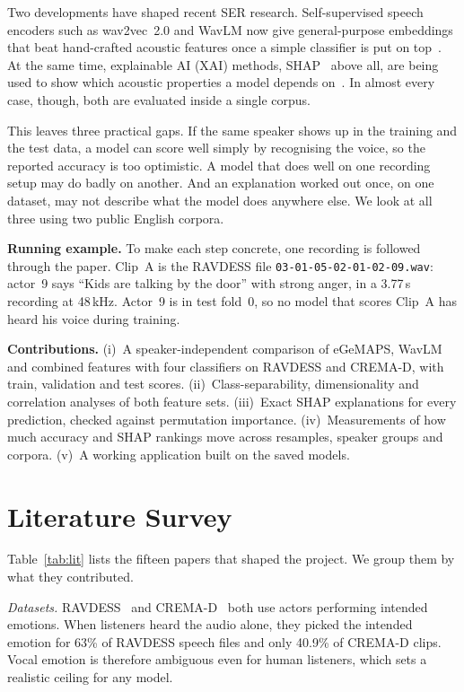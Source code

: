 \documentclass[conference]{IEEEtran}
\newcommand{\clipA}{Clip~A}
\begin{document}
Two developments have shaped recent SER research. Self-supervised speech encoders such as wav2vec~2.0 and WavLM now give general-purpose embeddings that beat hand-crafted acoustic features once a simple classifier is put on top~\cite{pepino,dixit,pastor}. At the same time, explainable AI (XAI) methods, SHAP~\cite{shap} above all, are being used to show which acoustic properties a model depends on~\cite{dixit,nfissi}. In almost every case, though, both are evaluated inside a single corpus.

This leaves three practical gaps. If the same speaker shows up in the training and the test data, a model can score well simply by recognising the voice, so the reported accuracy is too optimistic. A model that does well on one recording setup may do badly on another. And an explanation worked out once, on one dataset, may not describe what the model does anywhere else. We look at all three using two public English corpora.

\textbf{Running example.} To make each step concrete, one recording is followed through the paper. \clipA{} is the RAVDESS file \texttt{03-01-05-02-01-02-09.wav}: actor~9 says ``Kids are talking by the door'' with strong anger, in a 3.77\,s recording at 48\,kHz. Actor~9 is in test fold~0, so no model that scores \clipA{} has heard his voice during training.

\textbf{Contributions.} (i)~A speaker-independent comparison of eGeMAPS, WavLM and combined features with four classifiers on RAVDESS and CREMA-D, with train, validation and test scores. (ii)~Class-separability, dimensionality and correlation analyses of both feature sets. (iii)~Exact SHAP explanations for every prediction, checked against permutation importance. (iv)~Measurements of how much accuracy and SHAP rankings move across resamples, speaker groups and corpora. (v)~A working application built on the saved models.

\section{Literature Survey}
Table~\ref{tab:lit} lists the fifteen papers that shaped the project. We group them by what they contributed.

\emph{Datasets.} RAVDESS~\cite{ravdess} and CREMA-D~\cite{cremad} both use actors performing intended emotions. When listeners heard the audio alone, they picked the intended emotion for 63\% of RAVDESS speech files and only 40.9\% of CREMA-D clips. Vocal emotion is therefore ambiguous even for human listeners, which sets a realistic ceiling for any model.
\end{document}
